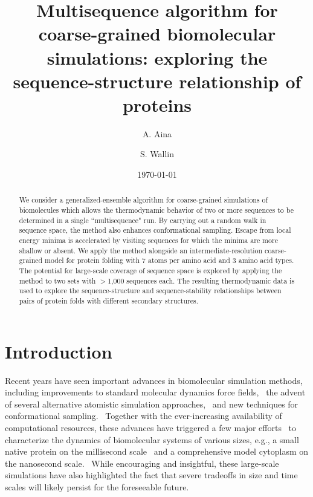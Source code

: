 \documentclass[
aip,
rsi,%
amsmath,amssymb,
reprint,%
]{revtex4-1}
\begin{document}

\title[Multisequence Monte Carlo simulations]{Multisequence algorithm for coarse-grained biomolecular simulations: exploring the sequence-structure relationship of proteins}

\author{A. Aina}
\author{S. Wallin}

\date{\today}

\begin{abstract}
We consider a generalized-ensemble algorithm for coarse-grained simulations of biomolecules which allows the thermodynamic behavior of two or more sequences to be determined in a single ``multisequence" run. By carrying out a random walk in sequence space, the method also enhances conformational sampling. Escape from local energy minima is accelerated by visiting sequences for which the minima are more shallow or absent. We apply the method alongside an intermediate-resolution coarse-grained model for protein folding with 7 atoms per amino acid and 3 amino acid types. The potential for large-scale coverage of sequence space is explored by applying the method to two sets with $>$1,000 sequences each. The resulting thermodynamic data is used to explore the sequence-structure and sequence-stability relationships between pairs of protein folds with different secondary structures.
\end{abstract}

                             

\maketitle

\section{Introduction}
\noindent
Recent years have seen important advances in biomolecular simulation methods, including improvements to standard molecular dynamics force fields,~\cite{Piana2014} the advent of several alternative atomistic simulation approaches,~\cite{Ding2008,Irback2006,Verma2009,Yang2007} and new techniques for  conformational sampling.~\cite{Bernardi2015} Together with the ever-increasing availability of computational resources, these advances have triggered a few major efforts~\cite{McGuffee2010,Miao2010,Perilla2016,Lindorff-Larsen2011,Yu2016} to characterize the dynamics of biomolecular systems of various sizes, e.g., a small native protein on the millisecond scale~\cite{Lindorff-Larsen2011} and a comprehensive model cytoplasm on the nanosecond scale.~\cite{Yu2016} While encouraging and insightful, these large-scale simulations have also highlighted the fact that severe tradeoffs in size and time scales will likely persist for the foreseeable future. 
\end{document}
